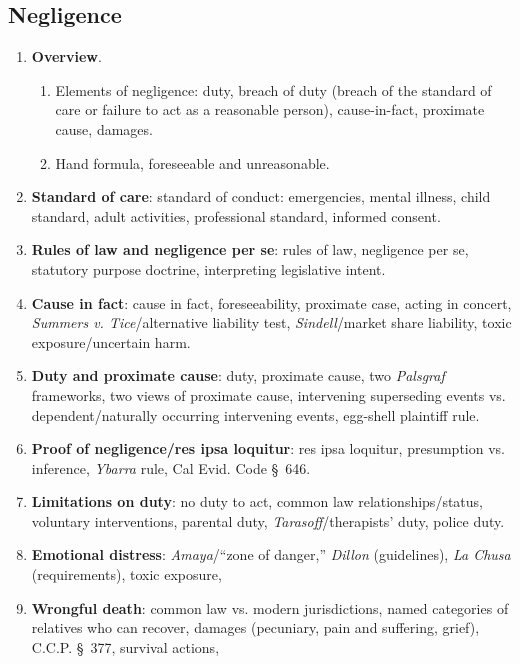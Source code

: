 \subsection{Negligence}

\begin{enumerate}
    \item \textbf{Overview}.
    \begin{enumerate}
        \item Elements of negligence: duty, breach of duty (breach of the 
        standard of care or failure to act as a reasonable person), 
        cause-in-fact, proximate cause, damages. 
        \item Hand formula, foreseeable and unreasonable.
    \end{enumerate}
    \item \textbf{Standard of care}: standard of conduct: emergencies, mental 
    illness, child standard, adult activities, professional standard, informed 
    consent.
    \item \textbf{Rules of law and negligence per se}: rules of law, 
    negligence per se, statutory purpose doctrine, interpreting legislative 
    intent.
    \item \textbf{Cause in fact}: cause in fact, foreseeability, proximate 
    case, acting in concert, \emph{Summers v. Tice}/alternative liability 
    test, \emph{Sindell}/market share liability, toxic exposure/uncertain 
    harm.
    \item \textbf{Duty and proximate cause}: duty, proximate cause, two 
    \emph{Palsgraf} frameworks, two views of proximate cause, intervening 
    superseding events vs. dependent/naturally occurring intervening events, 
    egg-shell plaintiff rule.
    \item \textbf{Proof of negligence/res ipsa loquitur}: res ipsa loquitur, 
    presumption vs. inference, \emph{Ybarra} rule, Cal Evid. Code \S\ 646.  
    \item \textbf{Limitations on duty}: no duty to act, common law 
    relationships/status, voluntary interventions, parental duty, 
    \emph{Tarasoff}/therapists' duty, police duty.
    \item \textbf{Emotional distress}: \emph{Amaya}/``zone of danger,'' 
    \emph{Dillon} (guidelines), \emph{La Chusa} (requirements), toxic 
    exposure,
    \item \textbf{Wrongful death}: common law vs. modern jurisdictions, named 
    categories of relatives who can recover, damages 
    (pecuniary, pain and suffering, grief), C.C.P. \S\ 377, survival actions, 

\end{enumerate}
